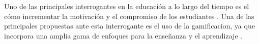 





 Uno de las principales interrogantes en la educación a lo largo del tiempo es el
 cómo incrementar la motivación y el compromiso de los estudiantes \cite{Lee}. Una
 de las principales propuestas ante esta interrogante es el uso de la
 \gls{gamificacion}, ya que incorpora una amplia gama de enfoques para la enseñanza
 y el aprendizaje \cite{Aldemir}.\\


